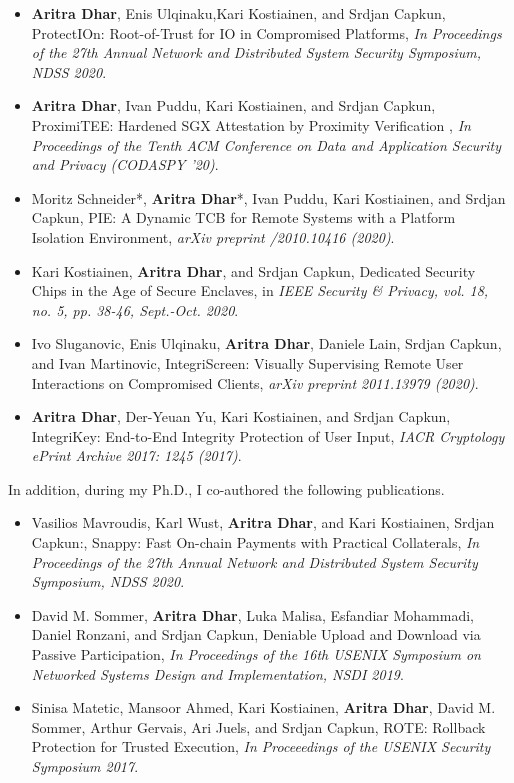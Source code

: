 \begin{itemize}
  
  \item \textbf{Aritra Dhar}, Enis Ulqinaku,Kari Kostiainen, and Srdjan Capkun, ProtectIOn: Root-of-Trust for IO in Compromised Platforms, \emph{In Proceedings of the 27th Annual Network and Distributed System Security Symposium, NDSS 2020}. 
  
  \item \textbf{Aritra Dhar}, Ivan Puddu, Kari Kostiainen, and Srdjan Capkun, ProximiTEE: Hardened SGX Attestation by Proximity Verification , \emph{In Proceedings of the Tenth ACM Conference on Data and Application Security and Privacy (CODASPY '20)}.
  
  \item Moritz Schneider*, \textbf{Aritra Dhar}*, Ivan Puddu, Kari Kostiainen, and Srdjan Capkun, PIE: A Dynamic TCB for Remote Systems with a Platform Isolation Environment, \emph{arXiv preprint /2010.10416 (2020)}.
  
  \item Kari Kostiainen, \textbf{Aritra Dhar}, and Srdjan Capkun, Dedicated Security Chips in the Age of Secure Enclaves, in \emph{IEEE Security \& Privacy, vol. 18, no. 5, pp. 38-46, Sept.-Oct. 2020}.
  
  \item Ivo Sluganovic, Enis Ulqinaku, \textbf{Aritra Dhar}, Daniele Lain, Srdjan Capkun, and Ivan Martinovic, IntegriScreen: Visually Supervising Remote User Interactions on Compromised Clients, \emph{arXiv preprint 2011.13979 (2020)}.
   
  \item \textbf{Aritra Dhar}, Der-Yeuan Yu, Kari Kostiainen, and Srdjan Capkun, IntegriKey: End-to-End Integrity Protection of User Input, \emph{IACR Cryptology ePrint Archive 2017: 1245 (2017)}.
 
\end{itemize}

 In addition, during my Ph.D., I co-authored the following publications.
 
 \begin{itemize}
   \item Vasilios Mavroudis, Karl Wust, \textbf{Aritra Dhar}, and Kari Kostiainen, Srdjan Capkun:, Snappy: Fast On-chain Payments with Practical Collaterals, \emph{In Proceedings of the 27th Annual Network and Distributed System Security Symposium, NDSS 2020}. 
   \item David M. Sommer, \textbf{Aritra Dhar}, Luka Malisa, Esfandiar Mohammadi, Daniel Ronzani, and Srdjan Capkun, Deniable Upload and Download via Passive Participation, \emph{In Proceedings of the 16th USENIX Symposium on Networked Systems Design and Implementation, NSDI 2019}.
   \item Sinisa Matetic, Mansoor Ahmed, Kari Kostiainen, \textbf{Aritra Dhar}, David M. Sommer, Arthur Gervais, Ari Juels, and Srdjan Capkun, ROTE: Rollback Protection for Trusted Execution, \emph{In Proceeedings of the USENIX Security Symposium 2017}.
 \end{itemize}